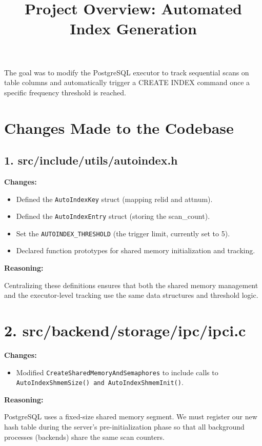 \documentclass[12pt]{article}
\title{Project Overview: Automated Index Generation}
\author{}
\date{}
\begin{document}
\maketitle

The goal was to modify the PostgreSQL executor to track sequential scans on table columns and automatically trigger a CREATE INDEX command once a specific frequency threshold is reached.

\section*{Changes Made to the Codebase}

\subsection*{1. src/include/utils/autoindex.h}

\textbf{Changes:}
\begin{itemize}[leftmargin=*]
\item Defined the \texttt{AutoIndexKey} struct (mapping relid and attnum).
\item Defined the \texttt{AutoIndexEntry} struct (storing the scan\_count).
\item Set the \texttt{AUTOINDEX\_THRESHOLD} (the trigger limit, currently set to 5).
\item Declared function prototypes for shared memory initialization and tracking.
\end{itemize}

\noindent\textbf{Reasoning:}

\noindent Centralizing these definitions ensures that both the shared memory management and the executor-level tracking use the same data structures and threshold logic.

\section*{2. src/backend/storage/ipc/ipci.c}

\textbf{Changes:}
\begin{itemize}[leftmargin=*]
\item Modified \texttt{CreateSharedMemoryAndSemaphores} to include calls to \texttt{AutoIndexShmemSize() and AutoIndexShmemInit()}.
\end{itemize}

\noindent\textbf{Reasoning:}

\noindent PostgreSQL uses a fixed-size shared memory segment. We must register our new hash table during the server's pre-initialization phase so that all background processes (backends) share the same scan counters.
\end{document}
